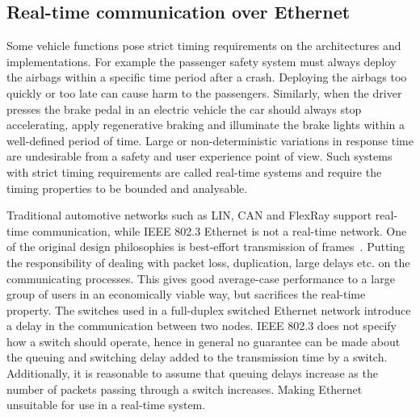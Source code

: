 \subsection{Real-time communication over Ethernet}
\label{sec:real-time-comm}
Some vehicle functions pose strict timing requirements on the architectures and implementations. For example the passenger safety system must always deploy the airbags within a specific time period after a crash. Deploying the airbags too quickly or too late can cause harm to the passengers. Similarly, when the driver presses the brake pedal in an electric vehicle the car should always stop accelerating, apply regenerative braking and illuminate the brake lights within a well-defined period of time. Large or non-deterministic variations in response time are undesirable from a safety and user experience point of view. Such systems with strict timing requirements are called real-time systems and require the timing properties to be bounded and analysable. 

Traditional automotive networks such as LIN, CAN and FlexRay support real-time communication, while IEEE 802.3 Ethernet is not a real-time network. One of the original design philosophies is best-effort transmission of frames~\cite{metcalfe1976ethernet}. Putting the responsibility of dealing with packet loss, duplication, large delays etc. on the communicating processes. This gives good average-case performance to a large group of users in an economically viable way, but sacrifices the real-time property. The switches used in a full-duplex switched Ethernet network introduce a delay in the communication between two nodes. IEEE 802.3 does not specify how a switch should operate, hence in general no guarantee can be made about the queuing and switching delay added to the transmission time by a switch. Additionally, it is reasonable to assume that queuing delays increase as the number of packets passing through a switch increases. Making Ethernet unsuitable for use in a real-time system. 

